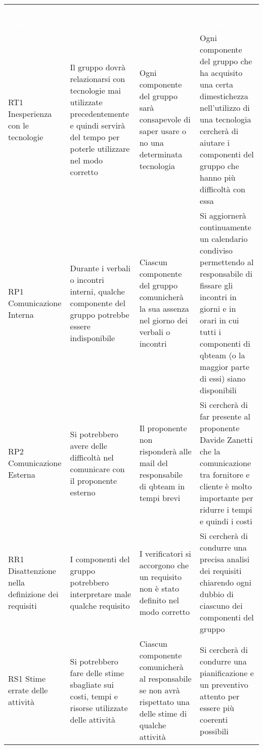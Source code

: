{
\renewcommand{\arraystretch}{2}
\centering
\begin{longtable}{ C{2cm} C{4.5cm} C{4.5cm} C{4.5cm}}
\textcolor{white}{\textbf{Codice Nome}} & \textcolor{white}{\textbf{Descrizione}} & \textcolor{white}{\textbf{Rilevamento}} &  \textcolor{white}{\textbf{Piano di Contingenza}}\\	

RT1 Inesperienza con le tecnologie & Il gruppo dovrà relazionarsi con tecnologie mai utilizzate precedentemente e quindi servirà del tempo per poterle utilizzare nel modo corretto & Ogni componente del gruppo sarà consapevole di saper usare o no una determinata tecnologia & Ogni componente del gruppo che ha acquisito una certa dimestichezza nell'utilizzo di una tecnologia cercherà di aiutare i componenti del gruppo che hanno più difficoltà con essa \\

RP1 Comunicazione Interna & Durante i verbali o incontri interni, qualche componente del gruppo potrebbe essere indisponibile & Ciascun componente del gruppo comunicherà la sua assenza nel giorno dei verbali o incontri & Si aggiornerà continuamente un calendario condiviso permettendo al responsabile di fissare gli incontri in giorni e in orari in cui tutti i componenti di qbteam (o la maggior parte di essi) siano disponibili \\ 

RP2 Comunicazione Esterna & Si potrebbero avere delle difficoltà nel comunicare con il proponente esterno & Il proponente non risponderà alle mail del responsabile di qbteam in tempi brevi & Si cercherà di far presente al proponente Davide Zanetti che la comunicazione tra fornitore e cliente è molto importante per ridurre i tempi e quindi i costi \\

RR1 Disattenzione nella definizione dei requisiti & I componenti del gruppo potrebbero interpretare male qualche requisito & I verificatori si accorgono che un requisito non è stato definito nel modo corretto & Si cercherà di condurre una precisa analisi dei requisiti chiarendo ogni dubbio di ciascuno dei componenti del gruppo \\

RS1 Stime errate delle attività & Si potrebbero fare delle stime sbagliate sui costi, tempi e risorse utilizzate delle attività & Ciascun componente comunicherà al responsabile se non avrà rispettato una delle stime di qualche attività & Si cercherà di condurre una pianificazione e un preventivo attento per essere più coerenti possibili \\


\end{longtable}}
